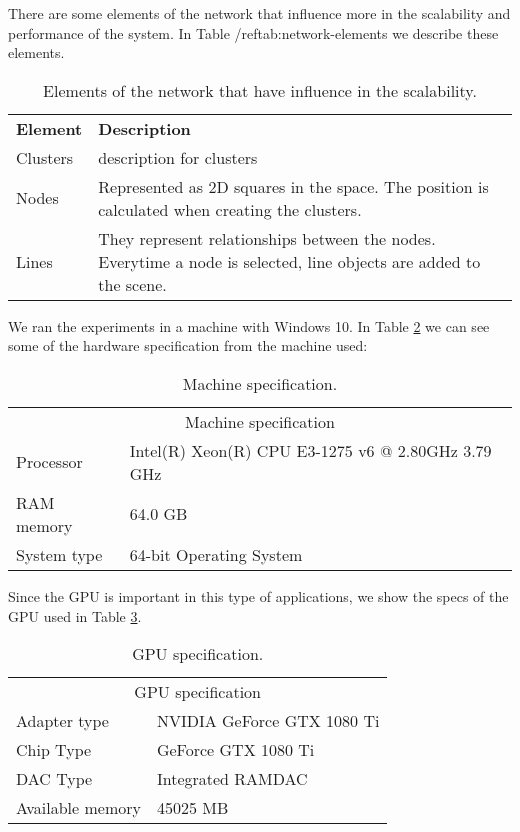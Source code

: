 There are some elements of the network that influence more in the scalability and performance of the system. In Table /ref{tab:network-elements} we describe these elements.

\begin{table}[h!]
\centering
\begin{tabular}{|p{4cm}|p{6cm}|}
\hline
\textbf{Element} & \textbf{Description} \\
Clusters & description for clusters \\
Nodes   & Represented as 2D squares in the space. The position is calculated when creating the clusters.  \\
Lines & They represent relationships between the nodes. Everytime a node is selected, line objects are added to the scene. \\
\hline
\end{tabular}
\caption{Elements of the network that have influence in the scalability.}
\label{tab:network-elements}
\end{table}

We ran the experiments in a machine with Windows 10. In Table \ref{tab:machine-specs} we can see some of the hardware specification from the machine used:
\begin{table}[h!]
\centering
\begin{tabular}{ll}
\multicolumn{2}{c}{Machine specification}                        \\
Processor   & Intel(R) Xeon(R) CPU E3-1275 v6 @ 2.80GHz 3.79 GHz \\
RAM memory  & 64.0 GB                                            \\
System type & 64-bit Operating System
\end{tabular}
\caption{Machine specification.}
\label{tab:machine-specs}
\end{table}

Since the GPU is important in this type of applications, we show the specs of the GPU used in Table \ref{tab:gpu-specs}.

\begin{table}[h!]
\centering
\begin{tabular}{ll}
\multicolumn{2}{c}{GPU specification} \\
Adapter type   & NVIDIA GeForce GTX 1080 Ti \\
Chip Type  &  GeForce GTX 1080 Ti \\
DAC Type & Integrated RAMDAC \\
Available memory & 45025 MB
\end{tabular}
\caption{GPU specification.}
\label{tab:gpu-specs}
\end{table}

